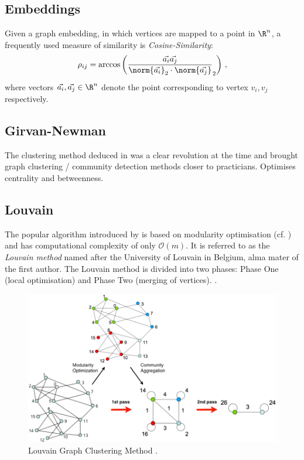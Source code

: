\documentclass[12pt, a4paper]{article}
\begin{document}
  \subsection{Embeddings}
  Given a graph embedding, in which vertices are mapped to a point in $\R^n$, a frequently used measure of similarity is \textit{Cosine-Similarity}:
  $$\rho_{ij} = \arccos\left(\frac{\vec{a_i} \vec{a_j}}{\norm{\vec{a_i}}_2 \cdot \norm{\vec{a_j}}}_2\right)\,,$$
  where vectors $\vec{a_i}, \vec{a_j} \in \R^n$ denote the point corresponding to vertex $v_i, v_j$ respectively.

  \subsection{Girvan-Newman}
  The clustering method deduced in \cite{girvan-newman} was a clear revolution at the time and brought graph clustering / community detection methods closer to practicians.
  Optimises centrality and betweenness.

  \subsection{Louvain}
  The popular algorithm introduced by \cite{lambiotte-louvain-clustering} is based on modularity optimisation (cf. ) and has computational complexity of only $\mathcal{O}(m)$.
  It is referred to as the \textit{Louvain method} named after the University of Louvain in Belgium, alma mater of the first author.
  The Louvain method is divided into two phases: Phase One (local optimisation) and Phase Two (merging of vertices).
  \cite{grindrod-lecture-notes}.

  \begin{figure}[H]
    \centering
    \includegraphics[width=\linewidth]{figures/blondel.png}
    \caption{Louvain Graph Clustering Method \cite{lambiotte-louvain-clustering}.}
  \end{figure}
\end{document}
